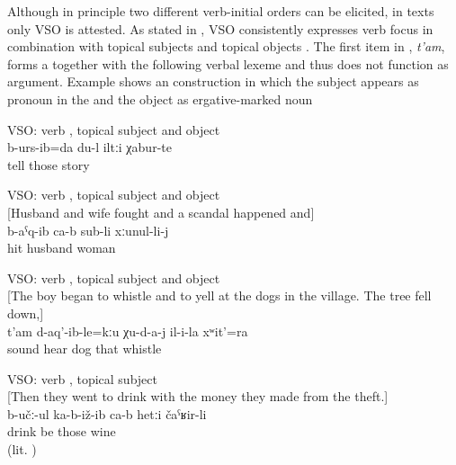 Although in principle two different verb-initial orders can be elicited, in texts only VSO is attested. As stated in \citet{Forker.Belyaev2016}, VSO consistently expresses verb focus in combination with topical subjects and topical objects . The first item in , \textit{t'am}, forms a  together with the following verbal lexeme and thus does not function as argument. Example  shows an  construction in which the subject appears as pronoun in the  and the object as ergative-marked noun 
%
\begin{exe}
	\ex	VSO: verb , topical subject and object\\	\label{ex:‎I already told these stories VSO}
	\gll	b-urs-ib=da	du-l	iltːi	χabur-te\\
		tell		those	story\\
	\glt	{}

	\ex	VSO: verb , topical subject and object\\\label{ex:‎‎The husband hit the wife VSO}%
		[Husband and wife fought and a scandal happened and]\\
	\gll	b-aˁq-ib	ca-b	sub-li	xːunul-li-j\\
		hit		husband	woman\\
	\glt	{}

	\ex	VSO: verb , topical subject and object\\\label{ex:and the dogs didn't hear his sound or whistling VSO}%
		[The boy began to whistle and to yell at the dogs in the village. The tree fell down,]\\
	\gll	t'am	d-aq'-ib-le=kːu	χu-d-a-j	il-i-la	xʷit'=ra\\
		sound	hear	dog	that	whistle\\
	\glt	{}

	\ex	VSO: verb , topical subject\\\label{ex:They sit and drink wine.IS}%
		[Then they went to drink with the money they made from the theft.]\\
	\gll	b-učː-ul	ka-b-iž-ib	ca-b	hetːi	čaˁʁir-li\\
		drink	be		those	wine\\
	\glt	{} (lit. )
\end{exe}

